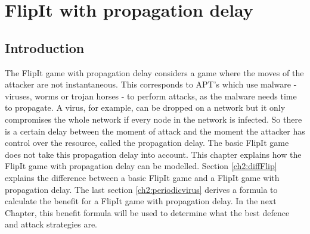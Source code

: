 \chapter{FlipIt with propagation delay}
\label{chapter2:FlipIt with virus propagation}
%


\section{Introduction}
\label{Ch2:Intro}
The FlipIt game with propagation delay considers a game where the moves of the attacker are not instantaneous. This corresponds to APT's which use malware - viruses, worms or trojan horses - to perform attacks, as the malware needs time to propagate. A virus, for example, can be dropped on a network but it only compromises the whole network if every node in the network is infected. So there is a certain delay between the moment of attack and the moment the attacker has control over the resource, called the propagation delay. The basic FlipIt game does not take this propagation delay into account. This chapter explains how the FlipIt game with propagation delay can be modelled. Section \ref{ch2:diffFlip} explains the difference between a basic FlipIt game and a FlipIt game with propagation delay. The last section \ref{ch2:periodicvirus} derives a formula to calculate the benefit for a FlipIt game with propagation delay. In the next Chapter, this benefit formula will be used to determine what the best defence and attack strategies are.
%
%
%

